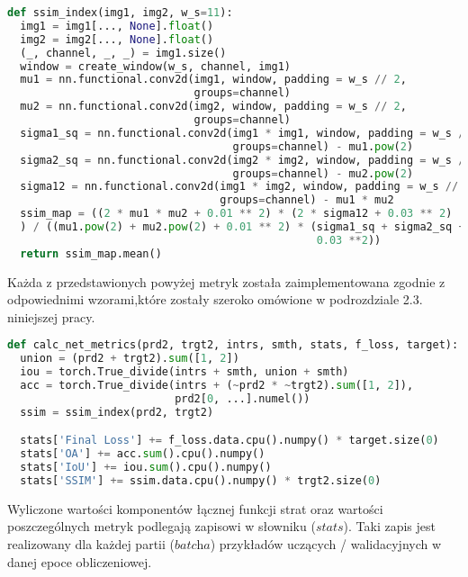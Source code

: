 \cell
\begin{lstlisting}[name=Rozdzial3.1, language=Python]
def ssim_index(img1, img2, w_s=11):
  img1 = img1[..., None].float()
  img2 = img2[..., None].float()
  (_, channel, _, _) = img1.size()
  window = create_window(w_s, channel, img1)
  mu1 = nn.functional.conv2d(img1, window, padding = w_s // 2, 
                             groups=channel)
  mu2 = nn.functional.conv2d(img2, window, padding = w_s // 2, 
                             groups=channel)
  sigma1_sq = nn.functional.conv2d(img1 * img1, window, padding = w_s // 2, 
                                   groups=channel) - mu1.pow(2)
  sigma2_sq = nn.functional.conv2d(img2 * img2, window, padding = w_s // 2,
                                   groups=channel) - mu2.pow(2)
  sigma12 = nn.functional.conv2d(img1 * img2, window, padding = w_s // 2, 
                                 groups=channel) - mu1 * mu2
  ssim_map = ((2 * mu1 * mu2 + 0.01 ** 2) * (2 * sigma12 + 0.03 ** 2)
  ) / ((mu1.pow(2) + mu2.pow(2) + 0.01 ** 2) * (sigma1_sq + sigma2_sq + 
                                                0.03 **2))
  return ssim_map.mean()
\end{lstlisting}


\cell
Każda z przedstawionych powyżej metryk została zaimplementowana zgodnie z odpowiednimi wzorami,które zostały szeroko omówione w podrozdziale 2.3. niniejszej pracy.

\cell
\begin{lstlisting}[name=Rozdzial3.1, language=Python]
def calc_net_metrics(prd2, trgt2, intrs, smth, stats, f_loss, target):
  union = (prd2 + trgt2).sum([1, 2])
  iou = torch.True_divide(intrs + smth, union + smth)
  acc = torch.True_divide(intrs + (~prd2 * ~trgt2).sum([1, 2]), 
                          prd2[0, ...].numel())
  ssim = ssim_index(prd2, trgt2)

  stats['Final Loss'] += f_loss.data.cpu().numpy() * target.size(0)
  stats['OA'] += acc.sum().cpu().numpy()
  stats['IoU'] += iou.sum().cpu().numpy()
  stats['SSIM'] += ssim.data.cpu().numpy() * trgt2.size(0)
\end{lstlisting}


\cell
Wyliczone wartości komponentów łącznej funkcji strat oraz wartości poszczególnych metryk podlegają zapisowi w słowniku ($\textit{stats}$). Taki zapis jest realizowany dla każdej partii ($\textit{batcha}$) przykładów uczących / walidacyjnych w danej epoce obliczeniowej. 

